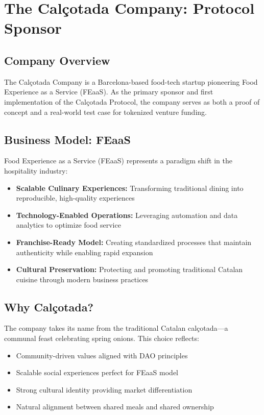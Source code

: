 \documentclass[conference]{IEEEtran}
\begin{document}
\appendix
\section{The Calçotada Company: Protocol Sponsor}

\subsection{Company Overview}

The Calçotada Company is a Barcelona-based food-tech startup pioneering Food Experience as a Service (FEaaS). As the primary sponsor and first implementation of the Calçotada Protocol, the company serves as both a proof of concept and a real-world test case for tokenized venture funding.

\subsection{Business Model: FEaaS}

Food Experience as a Service (FEaaS) represents a paradigm shift in the hospitality industry:

\begin{itemize}
    \item \textbf{Scalable Culinary Experiences:} Transforming traditional dining into reproducible, high-quality experiences
    \item \textbf{Technology-Enabled Operations:} Leveraging automation and data analytics to optimize food service
    \item \textbf{Franchise-Ready Model:} Creating standardized processes that maintain authenticity while enabling rapid expansion
    \item \textbf{Cultural Preservation:} Protecting and promoting traditional Catalan cuisine through modern business practices
\end{itemize}

\subsection{Why Calçotada?}

The company takes its name from the traditional Catalan calçotada—a communal feast celebrating spring onions. This choice reflects:
\begin{itemize}
    \item Community-driven values aligned with DAO principles
    \item Scalable social experiences perfect for FEaaS model
    \item Strong cultural identity providing market differentiation
    \item Natural alignment between shared meals and shared ownership
\end{itemize}
\end{document}
